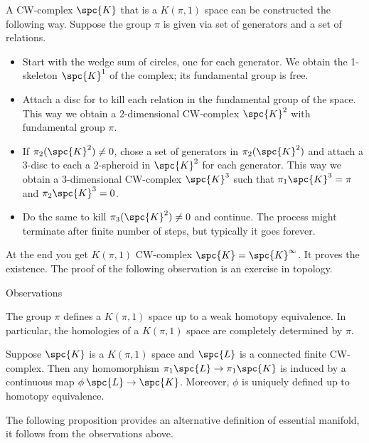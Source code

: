 A CW-complex $\spc{K}$ that is a $K(\pi,1)$ space can be constructed the following way.
Suppose the group $\pi$ is given via set of generators and a set of relations. 
\begin{itemize}
\item Start with the wedge sum of circles, one for each generator.
We obtain the 1-skeleton $\spc{K}^1$ of the complex; its fundamental group is free.

\item Attach a disc for to kill each relation in the fundamental group of the space.
This way we obtain a 2-dimensional CW-complex $\spc{K}^2$ with fundamental group $\pi$.

\item If $\pi_2(\spc{K}^2)\ne0$, chose a set of generators in $\pi_2(\spc{K}^2)$ and attach a $3$-disc to each a 2-spheroid in $\spc{K}^2$ for each generator.
This way we obtain a 3-dimensional CW-complex $\spc{K}^3$ such that  $\pi_1\spc{K}^3=\pi$ and $\pi_2\spc{K}^3=0$.


\item Do the same to kill $\pi_3(\spc{K}^2)\ne0$ and continue.
The process might terminate after finite number of steps, but typically it goes forever.
\end{itemize}
At the end you get $K(\pi,1)$ CW-complex  $\spc{K}=\spc{K}^\infty$.
It proves the existence.
The proof of the following observation is an exercise in topology.

\begin{thm}{Observations}

\begin{subthm}{}
The group $\pi$ defines a $K(\pi,1)$ space up to a weak homotopy equivalence.
In particular, the homologies of a $K(\pi,1)$ space are completely determined by $\pi$.
\end{subthm}


\begin{subthm}{}
Suppose $\spc{K}$ is a $K(\pi,1)$ space and $\spc{L}$ is a connected finite CW-complex.
Then any homomorphism $\pi_1\spc{L}\to\pi_1\spc{K}$ is induced by a continuous map $\phi\:\spc{L}\to\spc{K}$.
Moreover, $\phi$ is uniquely defined up to homotopy equivalence.
\end{subthm}

\end{thm}

The following proposition provides an alternative definition of essential manifold, it follows from the observations above.

